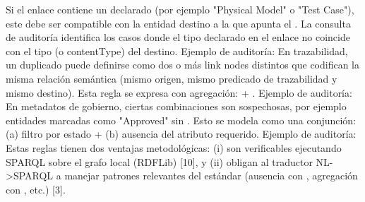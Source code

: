 {} Si el enlace contiene un  declarado (por ejemplo "Physical Model" o "Test Case"), este debe ser compatible con la entidad destino a la que apunta el . La consulta de auditoría identifica los casos donde el tipo declarado en el enlace no coincide con el tipo (o contentType) del destino.\markdownRendererInterblockSeparator
{}\markdownRendererUlBeginTight
\markdownRendererUlItem Ejemplo de auditoría: \markdownRendererUlItemEnd 
\markdownRendererUlEndTight \markdownRendererInterblockSeparator
{} En trazabilidad, un duplicado puede definirse como dos o más link nodes distintos que codifican la misma relación semántica (mismo origen, mismo predicado de trazabilidad y mismo destino). Esta regla se expresa con agregación:  + .\markdownRendererInterblockSeparator
{}\markdownRendererUlBeginTight
\markdownRendererUlItem Ejemplo de auditoría: \markdownRendererUlItemEnd 
\markdownRendererUlEndTight \markdownRendererInterblockSeparator
{} En metadatos de gobierno, ciertas combinaciones son sospechosas, por ejemplo entidades marcadas como "Approved" sin . Esto se modela como una conjunción: (a) filtro por estado + (b) ausencia del atributo requerido.\markdownRendererInterblockSeparator
{}\markdownRendererUlBeginTight
\markdownRendererUlItem Ejemplo de auditoría: \markdownRendererUlItemEnd 
\markdownRendererUlEndTight \markdownRendererInterblockSeparator
{}Estas reglas tienen dos ventajas metodológicas: (i) son verificables ejecutando SPARQL sobre el grafo local (RDFLib) [10], y (ii) obligan al traductor NL->SPARQL a manejar patrones relevantes del estándar (ausencia con , agregación con , etc.) [3].\markdownRendererInterblockSeparator
